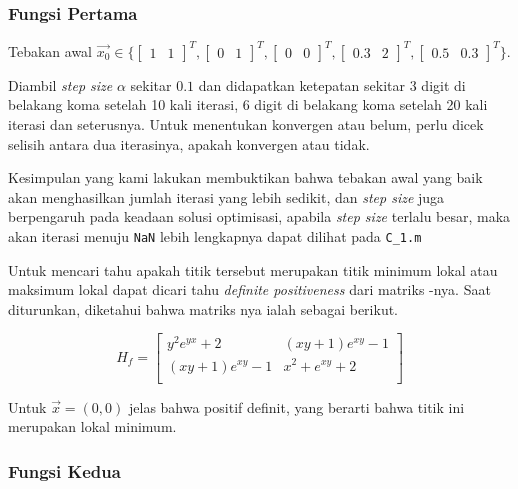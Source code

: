 \documentclass[11pt, a4paper, onecolumn, oneside, final]{report}
\begin{document}
\subsubsection*{Fungsi Pertama}
Tebakan awal $\vec{x_0} \in \{\begin{bmatrix} 1 & 1 \end{bmatrix}^{T}, \begin{bmatrix} 0 & 1 \end{bmatrix}^{T}, \begin{bmatrix} 0 & 0 \end{bmatrix}^{T}, \begin{bmatrix} 0.3 & 2 \end{bmatrix}^{T}, \begin{bmatrix} 0.5 & 0.3 \end{bmatrix}^{T}\}.$

Diambil \textit{step size} $\alpha$ sekitar $0.1$ dan didapatkan ketepatan sekitar $3$ digit di belakang koma setelah 10 kali iterasi, $6$ digit di belakang koma setelah 20 kali iterasi dan seterusnya. Untuk menentukan konvergen atau belum, perlu dicek selisih antara dua iterasinya, apakah konvergen atau tidak.
 
Kesimpulan yang kami lakukan membuktikan bahwa tebakan awal yang baik akan menghasilkan jumlah iterasi yang lebih sedikit, dan \textit{step size} juga berpengaruh pada keadaan solusi optimisasi, apabila \textit{step size} terlalu besar, maka akan iterasi menuju \texttt{NaN} lebih lengkapnya dapat dilihat pada \texttt{C\_1.m}

Untuk mencari tahu apakah titik tersebut merupakan titik minimum lokal atau maksimum lokal dapat dicari tahu \textit{definite positiveness} dari matriks -nya. Saat diturunkan, diketahui bahwa matriks nya ialah sebagai berikut.

$$
H_f =
\begin{bmatrix}
    y^2e^{yx} + 2 & (xy + 1)e^{xy} - 1\\
    (xy + 1)e^{xy} - 1 & x^2 + e^{xy} + 2\\
\end{bmatrix}
$$

Untuk $\vec{x} = (0, 0)$ jelas bahwa positif definit, yang berarti bahwa titik ini merupakan lokal minimum.

\subsubsection*{Fungsi Kedua}
\end{document}
